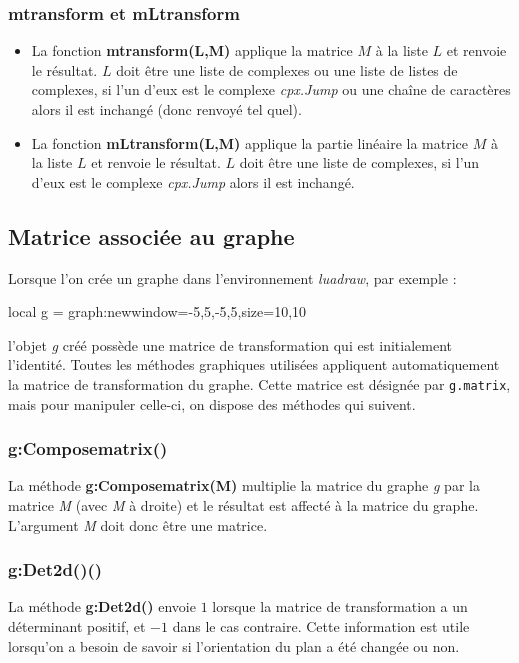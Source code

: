 \subsubsection{mtransform et mLtransform}
\begin{itemize}
    \item La fonction \textbf{mtransform(L,M)} applique la matrice $M$ à la liste $L$ et renvoie le résultat. $L$ doit être une liste de complexes ou une liste de listes de complexes, si l'un d'eux est le complexe \emph{cpx.Jump} ou une chaîne de caractères alors il est inchangé (donc renvoyé tel quel).
    \item La fonction \textbf{mLtransform(L,M)} applique la partie linéaire la matrice $M$ à la liste $L$ et renvoie le résultat. $L$ doit être une liste de complexes, si l'un d'eux est le complexe \emph{cpx.Jump} alors il est inchangé.
\end{itemize}

\subsection{Matrice associée au graphe}

Lorsque l'on crée un graphe dans l'environnement \emph{luadraw}, par exemple :
\begin{Luacode}
local g = graph:new{window={-5,5,-5,5},size={10,10}}
\end{Luacode}
l'objet \emph{g} créé possède une matrice de transformation qui est initialement l'identité. Toutes les méthodes graphiques utilisées appliquent automatiquement la matrice de transformation du graphe. Cette matrice est désignée par \texttt{g.matrix}, mais pour manipuler celle-ci, on dispose des méthodes qui suivent.

\subsubsection{g:Composematrix()}
La méthode \textbf{g:Composematrix(M)} multiplie la matrice du graphe \emph g par la matrice \emph{M} (avec \emph{M} à droite) et le résultat est affecté à la matrice du graphe. L'argument \emph{M} doit donc être une matrice.

\subsubsection{g:Det2d()()}
La méthode \textbf{g:Det2d()} envoie $1$ lorsque la matrice de transformation a un déterminant positif, et $-1$ dans le cas contraire. Cette information est utile lorsqu'on a besoin de savoir si l'orientation du plan a été changée ou non.

